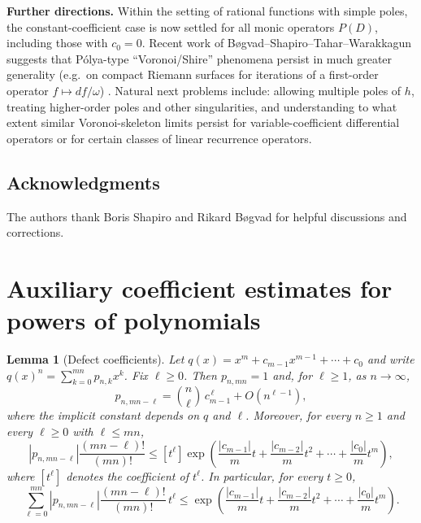 \documentclass[12pt]{article}
\theoremstyle{plain}
\newtheorem{lemma}[theorem]{Lemma}
\theoremstyle{definition}
\begin{document}
\medskip
\noindent\textbf{Further directions.}
Within the setting of rational functions with simple poles, the constant-coefficient case is now settled for all monic operators $P(D)$, including those with $c_0=0$.
Recent work of B\o gvad--Shapiro--Tahar--Warakkagun suggests that P\'olya-type ``Voronoi/Shire'' phenomena persist in much greater generality (e.g.\ on compact Riemann surfaces for iterations of a first-order operator $f\mapsto df/\omega$) \cite{BSTW}.
Natural next problems include: allowing multiple poles of $h$, treating higher-order poles and other singularities, and understanding to what extent similar Voronoi-skeleton limits persist for variable-coefficient differential operators or for certain classes of linear recurrence operators.

\subsection*{Acknowledgments}
The authors thank Boris Shapiro and Rikard B\o gvad for helpful discussions and corrections.

\appendix

\section{Auxiliary coefficient estimates for powers of polynomials}\label{app:coefficients}

\begin{lemma}[Defect coefficients]\label{lemDefect}
Let $q(x)=x^m+c_{m-1}x^{m-1}+\cdots+c_0$ and write $q(x)^n=\sum_{k=0}^{mn}p_{n,k}x^k$.
Fix $\ell\ge0$.
Then $p_{n,mn}=1$ and, for $\ell\ge1$, as $n\to\infty$,
$$p_{n,mn-\ell}=\binom{n}{\ell}\,c_{m-1}^{\,\ell}+O(n^{\ell-1}),$$
where the implicit constant depends on $q$ and $\ell$.
Moreover, for every $n\ge1$ and every $\ell\ge0$ with $\ell\le mn$,
$$\left|p_{n,mn-\ell}\right|\frac{(mn-\ell)!}{(mn)!}
\le [t^\ell]\exp\left(\frac{|c_{m-1}|}{m}t+\frac{|c_{m-2}|}{m}t^2+\cdots+\frac{|c_0|}{m}t^m\right),$$
where $[t^\ell]$ denotes the coefficient of $t^\ell$.
In particular, for every $t\ge0$,
$$\sum_{\ell=0}^{mn}\left|p_{n,mn-\ell}\right|\frac{(mn-\ell)!}{(mn)!}\,t^\ell
\le \exp\left(\frac{|c_{m-1}|}{m}t+\frac{|c_{m-2}|}{m}t^2+\cdots+\frac{|c_0|}{m}t^m\right).$$
\end{lemma}
\end{document}
